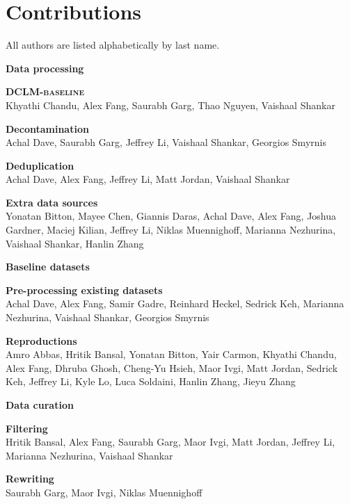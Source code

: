 \documentclass{article}
\newcommand{\hqpool}{\textsc{DCLM-baseline}\xspace}
\begin{document}
\clearpage

\appendix

\section{Contributions}\label{appx:contributions}

All authors are listed alphabetically by last name.

\begin{center}\large\textbf{Data processing}\end{center}
\textbf{\hqpool}\\[0.5em]
Khyathi Chandu, Alex Fang, Saurabh Garg, Thao Nguyen, Vaishaal Shankar

\textbf{Decontamination}\\[0.5em]
Achal Dave, Saurabh Garg, Jeffrey Li, Vaishaal Shankar, Georgios Smyrnis

\textbf{Deduplication}\\[0.5em]
Achal Dave, Alex Fang, Jeffrey Li, Matt Jordan, Vaishaal Shankar

\textbf{Extra data sources}\\[0.25em]
Yonatan Bitton, Mayee Chen, Giannis Daras, Achal Dave, Alex Fang, Joshua Gardner, Maciej Kilian, Jeffrey Li, Niklas Muennighoff, Marianna Nezhurina, Vaishaal Shankar, Hanlin Zhang

\begin{center}\large\textbf{Baseline datasets}\end{center}
\textbf{Pre-processing existing datasets}\\[0.25em]
Achal Dave, Alex Fang, Samir Gadre, Reinhard Heckel, Sedrick Keh, Marianna Nezhurina, Vaishaal Shankar, Georgios Smyrnis

\textbf{Reproductions}\\[0.25em]
Amro Abbas, Hritik Bansal, Yonatan Bitton, Yair Carmon, Khyathi Chandu, Alex Fang, Dhruba Ghosh, Cheng-Yu Hsieh, Maor Ivgi, Matt Jordan, Sedrick Keh, Jeffrey Li, Kyle Lo, Luca Soldaini, Hanlin Zhang, Jieyu Zhang

\begin{center}\large\textbf{Data curation}\end{center}

\textbf{Filtering}\\[0.25em]
Hritik Bansal, Alex Fang, Saurabh Garg, Maor Ivgi, Matt Jordan, Jeffrey Li, Marianna Nezhurina, Vaishaal Shankar

\textbf{Rewriting}\\[0.25em]
Saurabh Garg, Maor Ivgi, Niklas Muennighoff
\end{document}
